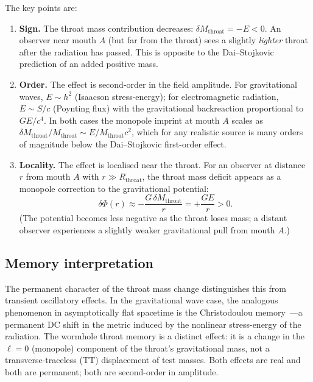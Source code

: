 \documentclass[aps,prd,onecolumn,nofootinbib,superscriptaddress]{revtex4-2}
\begin{document}
The key points are:

\begin{enumerate}
\item \textbf{Sign.} The throat mass contribution decreases: $\delta
M_{\mathrm{throat}} = -E < 0$.  An observer near mouth $A$ (but far from the
throat) sees a slightly \emph{lighter} throat after the radiation has passed.
This is opposite to the Dai--Stojkovic prediction of an added positive mass.

\item \textbf{Order.} The effect is second-order in the field amplitude.  For
gravitational waves, $E\sim h^2$ (Isaacson stress-energy); for electromagnetic
radiation, $E\sim S/c$ (Poynting flux) with the gravitational backreaction
proportional to $GE/c^4$.  In both cases the monopole imprint at mouth $A$
scales as $\delta M_{\mathrm{throat}}/M_{\mathrm{throat}} \sim E/M_{\mathrm{throat}} c^2$,
which for any realistic source is many orders of magnitude below the
Dai--Stojkovic first-order effect.

\item \textbf{Locality.}  The effect is localised near the throat.  For an
observer at distance $r$ from mouth $A$ with $r\gg R_{\mathrm{throat}}$, the
throat mass deficit appears as a monopole correction to the gravitational
potential:
\begin{equation}
  \delta\Phi(r) \approx -\frac{G\,\delta M_{\mathrm{throat}}}{r}
  = +\frac{G E}{r} > 0.
\end{equation}
(The potential becomes less negative as the throat loses mass; a distant observer
experiences a slightly weaker gravitational pull from mouth $A$.)
\end{enumerate}

\subsection{Memory interpretation}

The permanent character of the throat mass change distinguishes this from
transient oscillatory effects.  In the gravitational wave case, the analogous
phenomenon in asymptotically flat spacetime is the Christodoulou
memory~\cite{Christodoulou1991Memory}---a permanent DC shift in the metric induced by the nonlinear
stress-energy of the radiation.  The wormhole throat memory is a distinct effect:
it is a change in the $\ell=0$ (monopole) component of the throat's gravitational
mass, not a transverse-traceless (TT) displacement of test masses.  Both
effects are real and both are permanent; both are second-order in amplitude.
\end{document}
